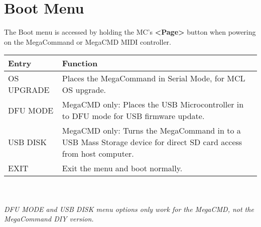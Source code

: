 \chapter{Boot Menu}
The Boot menu is accessed by holding the MC's \textbf{<Page>} button when powering on the MegaCommand or MegaCMD MIDI controller.
\\
\begin{tabular}{|l|l|}
\hline
\rowcolor[HTML]{C0C0C0} 
Entry                                  & Function                                                                       \\ \hline
OS UPGRADE        & Places the MegaCommand in Serial Mode, for MCL OS upgrade.                                                         \\ \hline
DFU MODE       & MegaCMD only: Places the USB Microcontroller in to DFU mode for USB firmware update.                                                            \\ \hline
USB DISK    & MegaCMD only: Turns the MegaCommand in to a USB Mass Storage device for direct SD card access from host computer.                                                          \\ \hline
EXIT      &  Exit the menu and boot normally.                                 \\ \hline                   
\end{tabular}
\\\\
\textit{DFU MODE and USB DISK menu options only work for the MegaCMD, not the MegaCommand DIY version.}
\\
\\